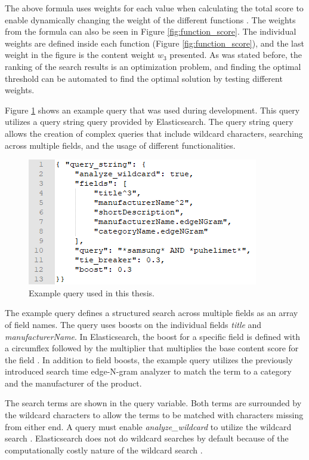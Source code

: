 The above formula uses weights for each value when calculating the total score to enable dynamically 
changing the weight of the different functions \cite{relevantSearch}.
The weights from the formula can also be seen in Figure \ref{fig:function_score}.
The individual weights are defined inside each function (Figure \ref{fig:function_score}), and the last weight
in the figure is the content weight $w_3$ presented.
As was stated before, the ranking of the search results is an optimization problem, and finding
the optimal threshold can be automated to find the optimal solution by testing different weights.


Figure \ref{fig:query_string} shows an example query that was used during development.
This query utilizes a query string query provided by Elasticsearch.
The query string query allows the creation of complex queries that include wildcard characters,
searching across multiple fields, and the usage of different functionalities.


\begin{figure}
    \centering
    \includegraphics[]{img/query_string.png}
    \caption{Example query used in this thesis.}
    \label{fig:query_string}
\end{figure}


The example query defines a structured search across multiple fields as an array of field names.
The query uses boosts on the individual fields \emph{title} and \emph{manufacturerName}.
In Elasticsearch, the boost for a specific field is defined with a circumflex followed by the multiplier
that multiplies the base content score for the field \cite{relevantSearch}.
In addition to field boosts, the example query utilizes the previously introduced search time 
edge-N-gram analyzer to match the term to a category and the manufacturer of the product.


The search terms are shown in the query variable.
Both terms are surrounded by the wildcard characters to allow the terms to be matched with
characters missing from either end.
A query must enable \emph{analyze\_wildcard} to utilize the wildcard search \cite{elasticIntro}.
Elasticsearch does not do wildcard searches by default because of the computationally costly nature
of the wildcard search \cite{relevantSearch}.


